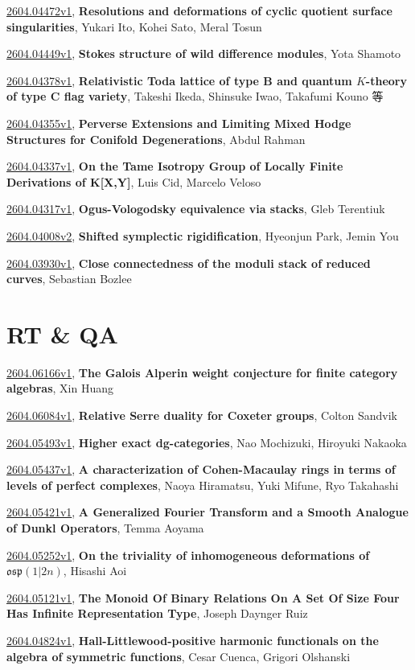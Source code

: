\documentclass[9pt, a4paper]{article}
\theoremstyle{plain}
\theoremstyle{definition}
\theoremstyle{remark}
\newcommand{\arxiv}[3]{\href{https://arxiv.org/abs/#1}{#1}, \textbf{\textcolor{arxivblue}{#2}}, #3}
\begin{document}
\arxiv{2604.04472v1}{Resolutions and deformations of cyclic quotient surface singularities}{Yukari Ito, Kohei Sato, Meral Tosun}

\arxiv{2604.04449v1}{Stokes structure of wild difference modules}{Yota Shamoto}

\arxiv{2604.04378v1}{Relativistic Toda lattice of type B and quantum $K$-theory of type C flag variety}{Takeshi Ikeda, Shinsuke Iwao, Takafumi Kouno 等}

\arxiv{2604.04355v1}{Perverse Extensions and Limiting Mixed Hodge Structures for Conifold Degenerations}{Abdul Rahman}

\arxiv{2604.04337v1}{On the Tame Isotropy Group of Locally Finite Derivations of K[X,Y]}{Luis Cid, Marcelo Veloso}

\arxiv{2604.04317v1}{Ogus-Vologodsky equivalence via stacks}{Gleb Terentiuk}

\arxiv{2604.04008v2}{Shifted symplectic rigidification}{Hyeonjun Park, Jemin You}

\arxiv{2604.03930v1}{Close connectedness of the moduli stack of reduced curves}{Sebastian Bozlee}


\section{RT \& QA}
\arxiv{2604.06166v1}{The Galois Alperin weight conjecture for finite category algebras}{Xin Huang}

\arxiv{2604.06084v1}{Relative Serre duality for Coxeter groups}{Colton Sandvik}

\arxiv{2604.05493v1}{Higher exact dg-categories}{Nao Mochizuki, Hiroyuki Nakaoka}

\arxiv{2604.05437v1}{A characterization of Cohen-Macaulay rings in terms of levels of perfect complexes}{Naoya Hiramatsu, Yuki Mifune, Ryo Takahashi}

\arxiv{2604.05421v1}{A Generalized Fourier Transform and a Smooth Analogue of Dunkl Operators}{Temma Aoyama}

\arxiv{2604.05252v1}{On the triviality of inhomogeneous deformations of $\mathfrak{osp}(1|2n)$}{Hisashi Aoi}

\arxiv{2604.05121v1}{The Monoid Of Binary Relations On A Set Of Size Four Has Infinite Representation Type}{Joseph Daynger Ruiz}

\arxiv{2604.04824v1}{Hall-Littlewood-positive harmonic functionals on the algebra of symmetric functions}{Cesar Cuenca, Grigori Olshanski}
\end{document}
